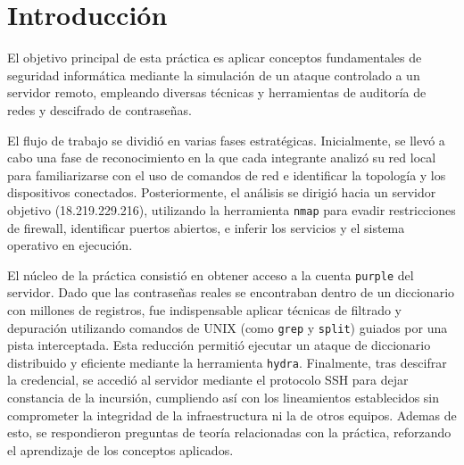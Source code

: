 \section{Introducción}

El objetivo principal de esta práctica es aplicar conceptos fundamentales de seguridad informática mediante la simulación de un ataque controlado a un servidor remoto, empleando diversas técnicas y herramientas de auditoría de redes y descifrado de contraseñas.

El flujo de trabajo se dividió en varias fases estratégicas. Inicialmente, se llevó a cabo una fase de reconocimiento en la que cada integrante analizó su red local para familiarizarse con el uso de comandos de red e identificar la topología y los dispositivos conectados. Posteriormente, el análisis se dirigió hacia un servidor objetivo (18.219.229.216), utilizando la herramienta \texttt{nmap} para evadir restricciones de firewall, identificar puertos abiertos, e inferir los servicios y el sistema operativo en ejecución.

El núcleo de la práctica consistió en obtener acceso a la cuenta \texttt{purple} del servidor. Dado que las contraseñas reales se encontraban dentro de un diccionario con millones de registros, fue indispensable aplicar técnicas de filtrado y depuración utilizando comandos de UNIX (como \texttt{grep} y \texttt{split}) guiados por una pista interceptada. Esta reducción permitió ejecutar un ataque de diccionario distribuido y eficiente mediante la herramienta \texttt{hydra}. Finalmente, tras descifrar la credencial, se accedió al servidor mediante el protocolo SSH para dejar constancia de la incursión, cumpliendo así con los lineamientos establecidos sin comprometer la integridad de la infraestructura ni la de otros equipos. Ademas de esto, se respondieron preguntas de teoría relacionadas con la práctica, reforzando el aprendizaje de los conceptos aplicados.